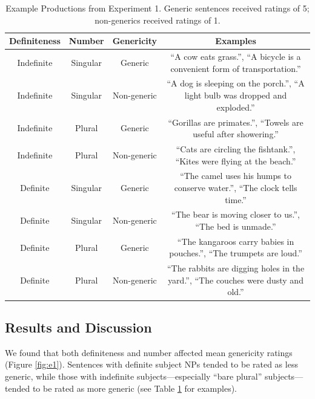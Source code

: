 \documentclass[10pt,letterpaper]{article}
\begin{document}

\begin{table}
\begin{center}
\caption{Example Productions from Experiment 1. Generic sentences received ratings of 5; non-generics received ratings of 1.}
\label{tab:ex}
\vskip 0.12in
\begin{tabular}{cccc}
\hline
Definiteness    &  Number & Genericity & Examples \\
\hline
Indefinite        &   Singular & Generic & ``A cow eats grass.'', ``A bicycle is a convenient form of transportation.''\\
Indefinite  &   Singular & Non-generic & ``A dog is sleeping on the porch.'', ``A light bulb was dropped and exploded.''\\
Indefinite           &   Plural & Generic & ``Gorillas are primates.'', ``Towels are useful after showering.''\\
Indefinite         &   Plural  & Non-generic & ``Cats are circling the fishtank.'', ``Kites were flying at the beach.''\\
Definite        &   Singular & Generic & ``The camel uses his humps to conserve water.'', ``The clock tells time.''  \\
Definite  &   Singular & Non-generic & ``The bear is moving closer to us.'', ``The bed is unmade.''\\
Definite           &   Plural & Generic & ``The kangaroos carry babies in pouches.'', ``The trumpets are loud.'' \\
Definite         &   Plural & Non-generic & ``The rabbits are digging holes in the yard.'', ``The couches were dusty and old.''\\
\hline
\end{tabular}
\end{center}
\end{table}

\subsection{Results and Discussion}

We found that both definiteness and number affected mean genericity ratings (Figure \ref{fig:e1}). Sentences with definite subject NPs tended to be rated as less generic, while those with indefinite subjects---especially ``bare plural'' subjects---tended to be rated as more generic (see Table \ref{tab:ex} for examples).
\end{document}
